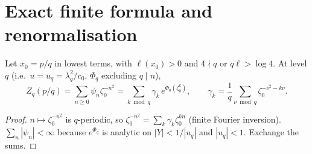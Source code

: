 \documentclass[11pt]{article}
\theoremstyle{definition}\newtheorem{definition}[theorem]{Definition}
\theoremstyle{remark}\newtheorem{remark}[theorem]{Remark}
\begin{document}
\section{Exact finite formula and renormalisation}
\begin{lemma}[Zk; PROVED]\label{lem:Zk}
Let $x_0=p/q$ in lowest terms, with $\ell(x_0)>0$ and $4\nmid q$ or $q\ell>\log4$. At level $q$ (i.e.\ $u=u_q=\lambda_q^2/c_0$, $\Phi_q$ excluding $q\mid n$),
\[Z_q(p/q)=\sum_{n\ge0}\psi_n\zeta_0^{-n^2}=\sum_{k\bmod q}\gamma_k\,e^{\Phi_q(\zeta_0^k)},\qquad\gamma_k=\frac1q\sum_{\nu\bmod q}\zeta_0^{-\nu^2-k\nu}.\]
\end{lemma}
\begin{proof}
$n\mapsto\zeta_0^{-n^2}$ is $q$-periodic, so $\zeta_0^{-n^2}=\sum_k\gamma_k\zeta_0^{kn}$ (finite Fourier inversion).
$\sum_n|\psi_n|<\infty$ because $e^{\Phi_q}$ is analytic on $|Y|<1/|u_q|$ and $|u_q|<1$. Exchange the sums.
\end{proof}
\end{document}
